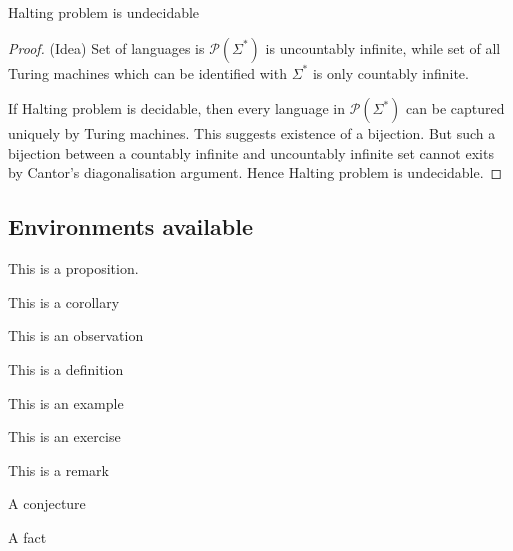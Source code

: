 \begin{claim} 
Halting problem is undecidable
\end{claim}
\begin{proof}(Idea)
Set of languages is $\mathcal{P}(\Sigma^*)$ is uncountably infinite,
while set of all Turing machines which can be identified with 
$\Sigma^*$ is only countably infinite. 

If Halting problem is 
decidable, then every language in $\mathcal{P}(\Sigma^*)$ can be 
captured uniquely by Turing machines. This suggests existence of a 
bijection. But such a bijection between a countably infinite 
and uncountably infinite set cannot exits by Cantor's diagonalisation argument. 
Hence Halting problem is undecidable.
\end{proof}

\subsection{Environments available}
\begin{proposition}
This is a proposition.
\end{proposition}
\begin{corollary}
	This is a corollary
\end{corollary}
\begin{observation}
	This is an observation
\end{observation}
\begin{definition}
	This is a definition
\end{definition}
\begin{example}
	This is an example
\end{example}
\begin{exercise}
	This is an exercise
\end{exercise}
\begin{remark}
	This is a remark
\end{remark}
\begin{conjecture}
	A conjecture
\end{conjecture}

\begin{fact}
	A fact
\end{fact}



